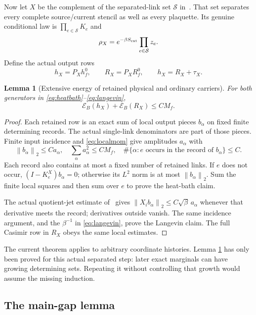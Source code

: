 \documentclass[11pt,letterpaper]{article}
\newtheorem{lemma}[theorem]{Lemma}
\theoremstyle{remark}\newtheorem{remark}[theorem]{Remark}
\newcommand{\norm}[1]{\left\lVert#1\right\rVert}
\newcommand{\cE}{\mathcal E}
\begin{document}
Now let $X$ be the complement of the separated-link set $\mathcal S$ in~\cite[\S\S3--5]{SZ}. That set separates every complete source/current stencil as well as every plaquette. Its genuine conditional law is $\prod_{e\in\mathcal S}K_e$ and
\[
 \rho_X=e^{-\beta S_{\rm ext}}\prod_{e\in\mathcal S}z_e.
\]
Define the actual output rows
\begin{equation}\label{eq:hR}
 h_X=P_Xh_f^0,\qquad R_X=P_XR_f^0,\qquad h_X=R_X+\tau_X.
\end{equation}

\begin{lemma}[Extensive energy of retained physical and ordinary carriers]\label{lem:energy}
For both generators in \eqref{eq:heatbath}--\eqref{eq:langevin},
\begin{equation}\label{eq:posenergy}
 \boxed{\quad \cE_B(h_X)+\cE_B(R_X)\le CM_f.\quad}
\end{equation}
\end{lemma}
\begin{proof}
Each retained row is an exact sum of local output pieces $b_\alpha$ on fixed finite determining records. The actual single-link denominators are part of those pieces. Finite input incidence and \eqref{eq:localmom} give amplitudes $a_\alpha$ with
\[
 \norm{b_\alpha}_2\le Ca_\alpha,\quad
 \sum_\alpha a_\alpha^2\le CM_f,\quad
 \#\{\alpha:e\text{ occurs in the record of }b_\alpha\}\le C.
\]
Each record also contains at most a fixed number of retained links. If $e$ does not occur, $(I-K_e^X)b_\alpha=0$; otherwise its $L^2$ norm is at most $\norm{b_\alpha}_2$. Sum the finite local squares and then sum over $e$ to prove the heat-bath claim.

The actual quotient-jet estimate of~\cite[\S2]{SZ} gives
$\norm{X_i b_\alpha}_2\le C\sqrt\beta\,a_\alpha$ whenever that derivative meets the record; derivatives outside vanish. The same incidence argument, and the $\beta^{-1}$ in \eqref{eq:langevin}, prove the Langevin claim. The full Casimir row in $R_X$ obeys the same local estimates.
\end{proof}

The current theorem applies to arbitrary coordinate histories. Lemma \ref{lem:energy} has only been proved for this actual separated step: later exact marginals can have growing determining sets. Repeating it without controlling that growth would assume the missing induction.

\subsection{The main-gap lemma}
\end{document}
